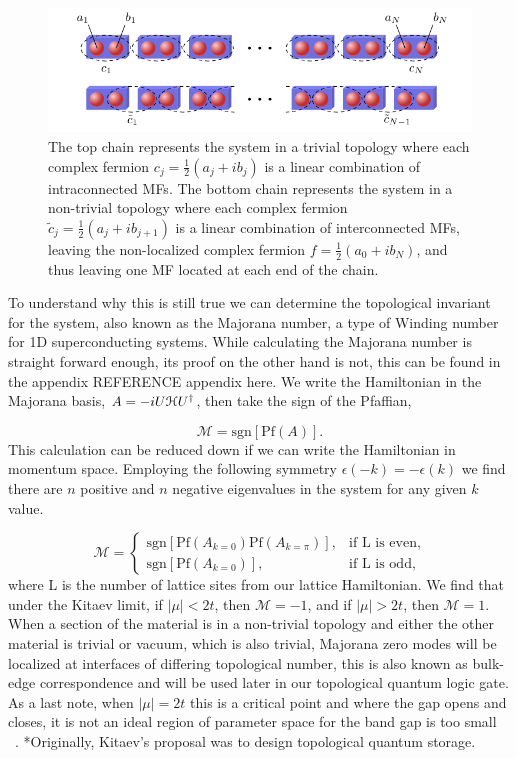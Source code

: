 \begin{figure}
  \includegraphics[width=\textwidth]{./figures/kitaev-chain.pdf}
  \caption{The top chain represents the system in a trivial topology where each complex fermion $c_j = \tfrac{1}{2}(a_j + i b_j)$ is a linear combination of intraconnected MFs. The bottom chain represents the system in a non-trivial topology where each complex fermion $\tilde{c}_j = \tfrac{1}{2}(a_j + i b_{j+1})$ is a linear combination of interconnected MFs, leaving the non-localized complex fermion $f = \tfrac{1}{2}(a_0 + i b_N)$, and thus leaving one MF located at each end of the chain.}
  \label{fig:kitaev-chain}
\end{figure}

To understand why this is still true we can determine the topological invariant for the system, also known as the Majorana number, a type of Winding number for 1D superconducting systems.
While calculating the Majorana number is straight forward enough, its proof on the other hand is not, this can be found in the appendix REFERENCE appendix here.
We write the Hamiltonian in the Majorana basis, $A = -iU \mathcal{H} U^{\dagger}$, then take the sign of the Pfaffian,

\begin{equation}
  \mathcal{M} = \text{sgn} [\text{Pf} (A)].
\end{equation}
This calculation can be reduced down if we can write the Hamiltonian in momentum space.
Employing the following symmetry $\epsilon(-k) = -\epsilon(k)$ we find there are $n$ positive and $n$ negative eigenvalues in the system for any given $k$ value.

\begin{equation}
  \mathcal{M} =
  \begin{cases}
    \text{sgn} [\text{Pf} (A_{k=0}) \text{Pf} (A_{k=\pi})], &\text{if L is even}, \\
    \text{sgn} [\text{Pf} (A_{k=0})], &\text{if L is odd},
  \end{cases}
\end{equation}
where L is the number of lattice sites from our lattice Hamiltonian.
We find that under the Kitaev limit, if $|\mu|< 2t$, then $\mathcal{M} = -1$, and if $|\mu| > 2t$, then $\mathcal{M} = 1$.
When a section of the material is in a non-trivial topology and either the other material is trivial or vacuum, which is also trivial, Majorana zero modes will be localized at interfaces of differing topological number, this is also known as bulk-edge correspondence and will be used later in our topological quantum logic gate.
As a last note, when $|\mu| = 2t$ this is a critical point and where the gap opens and closes, it is not an ideal region of parameter space for the band gap is too small ~\cite{kitaevUnpairedMajoranaFermions2001}.
*Originally, Kitaev's proposal was to design topological quantum storage.

